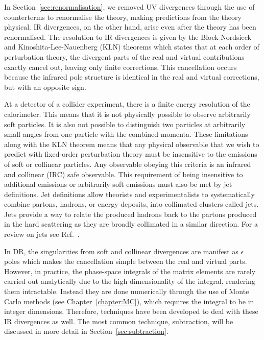 \documentclass[main.tex]{subfiles}
\begin{document}
    In Section~\ref{sec:renormalisation}, we removed UV divergences
    through the use of counterterms to renormalise the theory, making
    predictions from the theory physical.
    IR divergences, on the other hand, arise even after the theory
    has been renormalised. The resolution to IR divergences is given by the
    Block-Nordsieck \cite{Bloch:1937pw,Yennie:1961ad} and Kinoshita-Lee-Nauenberg
    (KLN) theorems \cite{Kinoshita:1962ur,Lee:1964is} which states
    that at each order of perturbation theory, the divergent parts of the real and virtual
    contributions exactly cancel out, leaving only finite corrections.
    This cancellation occurs because the infrared pole structure is
    identical in the real and virtual corrections, but with an opposite sign.

    At a detector of a collider experiment, there is a finite
    energy resolution of the calorimeter. This means that
    it is not physically possible to observe arbitrarily soft
    particles. It is also not possible to distinguish two particles
    at arbitrarily small angles from one particle with the combined
    momenta. These limitations along with the KLN theorem
    means that any physical observable that we wish to predict
    with fixed-order perturbation theory must be insensitive to the
    emissions of soft or collinear particles. Any observable obeying
    this criteria is an infrared and collinear (IRC) safe observable.
    This requirement of being insensitive to additional emissions
    or arbitrarily soft emissions must also be met by jet definitions.
    Jet definitions allow theorists and experimentalists to
    systematically combine partons, hadrons, or energy deposits,
    into collimated clusters called jets. Jets provide a way to relate
    the produced hadrons back to the partons produced in the hard scattering
    as they are broadly collimated in a similar direction.
    For a review on jets see Ref.~\cite{Salam:2010nqg}.

    In DR, the singularities from soft and collinear divergences
    are manifest as $\epsilon$ poles which makes the cancellation
    simple between the real and virtual parts. However, in practice, 
    the phase-space integrals of the matrix elements are rarely carried
    out analytically due to the high dimensionality of the integral,
    rendering them intractable.
    Instead they are done numerically through the use
    of Monte Carlo methods (see Chapter~\ref{chapter:MC}),
    which requires the integral to be in
    integer dimensions. Therefore, techniques
    have been developed to deal with these IR divergences as well. The
    most common technique, subtraction, will be discussed in
    more detail in Section~\ref{sec:subtraction}.
    
\end{document}
